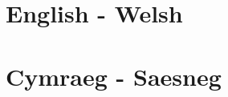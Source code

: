 \documentclass{article}
\makeatletter
\let\mcnewpage=\newpage
\newcommand{\TrickSupertabularIntoMulticols}{%
  \renewcommand\newpage{%
    \if@firstcolumn
      \hrule width\linewidth height0pt
      \columnbreak
    \else
      \mcnewpage
    \fi
  }%
}
\makeatother
\begin{document}
\pagestyle{ency}

\section*{English - Welsh}

\begin{multicols}{2}
\TrickSupertabularIntoMulticols
\small{
\tabletail{\hline}

}
\end{multicols}

\newpage

\pagestyle{cyen}

\section*{Cymraeg - Saesneg}

\begin{multicols}{2}
\TrickSupertabularIntoMulticols
\small{
\tabletail{\hline}

}
\end{multicols}
\end{document}
